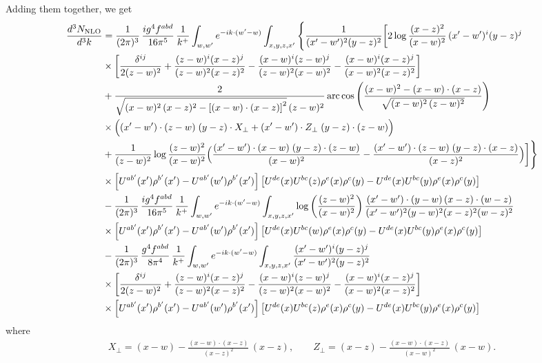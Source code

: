 \documentclass[9pt]{article}
\numberwithin{equation}{section}
\begin{document}
Adding them together, we get
\begin{align}
\frac{d^{3}N_{\rm NLO}}{d^{3}k} &=\frac{1}{(2\pi)^{3}}\,\frac{ig^{4}f^{abd}}{16\pi^{5}}\,\frac{1}{k^{+}}\int_{w,w'}e^{-ik\cdot(w'-w)}\int_{x,y,z,x'}\Bigg\{\frac{1}{(x'-w')^{2}(y-z)^{2}}\bigg[2\log\frac{(x-z)^{2}}{(x-w)^{2}}\,(x'-w')^{i}(y-z)^{j}\notag \\
& \times\bigg[\frac{\delta^{ij}}{2(z-w)^{2}}+\frac{(z-w)^{i}(x-z)^{j}}{(z-w)^{2}(x-z)^{2}}-\frac{(x-w)^{i}(z-w)^{j}}{(z-w)^{2}(x-w)^{2}}-\frac{(x-w)^{i}(x-z)^{j}}{(x-w)^{2}(x-z)^{2}}\bigg]\notag \\
& +\frac{2}{\sqrt{(x-w)^{2}\,(x-z)^{2}-\left[(x-w)\cdot (x-z)\right]^{2}}\,(z-w)^{2}}\,\mathrm{arc\,cos}\left(\frac{(x-w)^{2}-(x-w)\cdot (x-z)}{\sqrt{(x-w)^{2}\,(z-w)^{2}}}\right)\notag \\
& \times\Big((x'-w')\cdot(z-w)\;(y-z)\cdot X_{\perp}+(x'-w')\cdot Z_{\perp}\;(y-z)\cdot(z-w)\Big)\notag\\
&+\frac{1}{(z-w)^{2}}\log\frac{(z-w)^{2}}{(x-w)^{2}}\Big(\frac{(x'-w')\cdot(x-w)\;(y-z)\cdot(z-w)}{(x-w)^{2}}-\frac{(x'-w')\cdot(z-w)\;(y-z)\cdot(x-z)}{(x-z)^{2}}\Big)\bigg]\Bigg\}\notag\\
&\times\left[U^{ab'}(x')\rho^{b'}(x')-U^{ab'}(w')\rho^{b'}(x')\right]\left[U^{de}(x)U^{bc}(z)\rho^{e}(x)\rho^{c}(y)-U^{de}(x)U^{bc}(y)\rho^{e}(x)\rho^{c}(y)\right]\notag\\
&-\frac{1}{(2\pi)^{3}}\,\frac{ig^{4}f^{abd}}{16\pi^{5}}\,\frac{1}{k^{+}}\int_{w,w'}e^{-ik\cdot(w'-w)}\int_{x,y,z,x'}\log\left(\frac{(z-w)^{2}}{(x-w)^{2}}\right)\frac{(x'-w')\cdot(y-w)\,(x-z)\cdot(w-z)}{(x'-w')^{2}(y-w)^{2}(x-z)^{2}(w-z)^{2}}\notag\\
&\times\left[U^{ab'}(x')\rho^{b'}(x')-U^{ab'}(w')\rho^{b'}(x')\right]\left[U^{de}(x)U^{bc}(w)\rho^{e}(x)\rho^{c}(y)-U^{de}(x)U^{bc}(y)\rho^{e}(x)\rho^{c}(y)\right]\notag \\
&-\frac{1}{(2\pi)^{3}}\,\frac{g^{4}f^{abd}}{8\pi^{4}}\,\frac{1}{k^{+}}\int_{w,w'}e^{-ik\cdot(w'-w)}\int_{x,y,z,x'}\frac{(x'-w')^{i}(y-z)^{j}}{(x'-w')^{2}(y-z)^{2}}\notag \\
&\times\bigg[\frac{\delta^{ij}}{2(z-w)^{2}}+\frac{(z-w)^{i}(x-z)^{j}}{(z-w)^{2}(x-z)^{2}}-\frac{(x-w)^{i}(z-w)^{j}}{(z-w)^{2}(x-w)^{2}}-\frac{(x-w)^{i}(x-z)^{j}}{(x-w)^{2}(x-z)^{2}}\bigg] \notag\\
&\times\left[U^{ab'}(x')\rho^{b'}(x')-U^{ab'}(w')\rho^{b'}(x')\right]\left[U^{de}(x)U^{bc}(z)\rho^{e}(x)\rho^{c}(y)-U^{de}(x)U^{bc}(y)\rho^{e}(x)\rho^{c}(y)\right]
\end{align}
where
\begin{align}
X_{\perp}=(x-w)-\frac{(x-w)\cdot(x-z)}{(x-z)^{2}}\,(x-z),\qquad
Z_{\perp}=(x-z)-\frac{(x-w)\cdot(x-z)}{(x-w)^{2}}\,(x-w).
\end{align}
\end{document}
